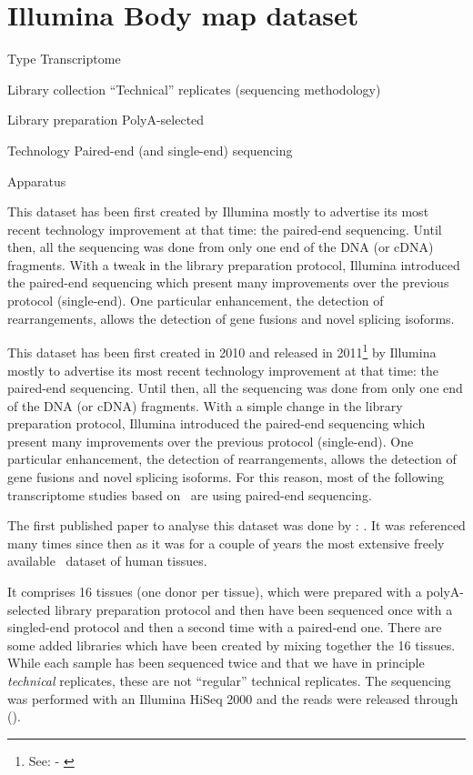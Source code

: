 \section{Illumina Body map dataset}
\label{ch:IBMData}

\begin{eqlist}
    \item[Type] Transcriptome
    \item[Library collection] ``Technical'' replicates (sequencing methodology)
    \item[Library preparation] PolyA-selected
    \item[Technology] Paired-end (and single-end) sequencing
    \item[Apparatus]
\end{eqlist}

This dataset has been first created by Illumina mostly to advertise its most
recent technology improvement at that time: the paired-end sequencing.  Until
then, all the sequencing was done from only one end of the \gls{DNA} (or
\gls{cDNA}) fragments. With a tweak in the library preparation protocol, Illumina
introduced the paired-end sequencing which present many improvements over the
previous protocol (single-end). One particular enhancement, the detection of
rearrangements, allows the detection of gene fusions and novel splicing isoforms.


This dataset has been first created in 2010 and released in
2011\footnote{See:  - \cite{ibmEnsembl}} by Illumina
mostly to advertise its most recent technology improvement at that time:
the paired-end sequencing.
Until then, all the sequencing was done from only one end of the \gls{DNA} (or
\gls{cDNA}) fragments. With a simple change in the library preparation protocol,
Illumina introduced the paired-end sequencing which present many improvements
over the previous protocol (single-end). One particular enhancement, the
detection of rearrangements, allows the detection of gene fusions and
novel splicing isoforms. For this reason, most of the following transcriptome
studies based on \Rnaseq\ are using paired-end sequencing.

The first published paper to analyse this dataset was done by
\citet{ibmrelatedpaper}: .
It was referenced many times since then as it was for a couple of years
the most extensive freely available \Rnaseq\ dataset of human tissues.

It comprises 16 tissues (one donor per tissue), which were prepared with a
polyA-selected library preparation protocol and then have been sequenced once
with a singled-end protocol and then a second time with a paired-end one. There
are some added libraries which have been created by mixing together the 16 tissues.
While each sample has been sequenced twice and that we have in principle
\emph{technical} replicates, these are not ``regular'' technical
replicates.
The sequencing was performed with an Illumina HiSeq 2000 and the reads were
released through  ().

\clearpage

